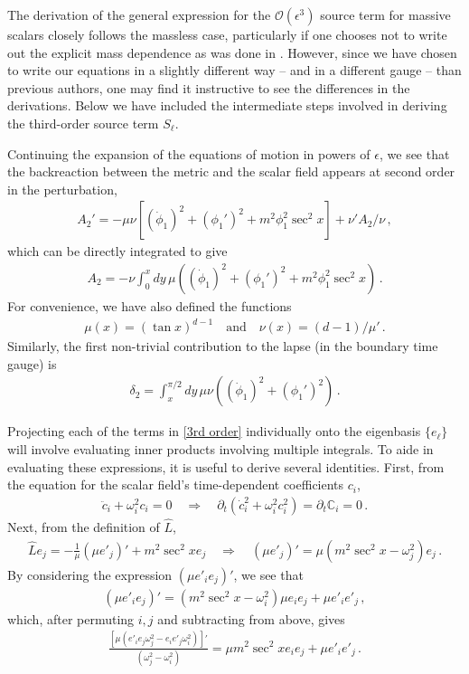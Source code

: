 \documentclass[letterpaper,11pt]{article}
\newcommand{\p}{\partial}
\newcommand{\oi}{\omega_i}
\newcommand{\oj}{\omega_j}
\newcommand{\mc}{\mathcal}
\begin{document}
The derivation of the general expression for the $\mc{O}(\epsilon^3)$ source term for massive scalars closely follows the massless case, particularly if one chooses not to write out the explicit mass dependence as was done in \cite{1810.04753}. However, since we have chosen to write our equations in a slightly different way -- and in a different gauge -- than previous authors, one may find it instructive to see the differences in the derivations. Below we have included the intermediate steps involved in deriving the third-order source term $S_\ell$.

Continuing the expansion of the equations of motion in powers of $\epsilon$, we see that the backreaction between the metric and the scalar field appears at second order in the perturbation,
\begin{align}
A_2' = - \mu \nu \left[ (\dot \phi_1 )^2 + (\phi_1')^2 + m^2 \phi_1^2 \sec^2 x \right] + \nu' A_2 / \nu \, ,
\end{align}
which can be directly integrated to give
\begin{align}
A_2 = -\nu \int^x_0 dy \, \mu \left( (\dot \phi_1 )^2 + (\phi_1')^2 + m^2 \phi_1^2 \sec^2 x \right) \, .
\end{align}
For convenience, we have also defined the functions
\begin{align}
\mu (x) = \left( \tan x \right)^{d-1} \quad \text{and} \quad \nu(x) = (d-1) / \mu ' \, .
\end{align}
Similarly, the first non-trivial contribution to the lapse (in the boundary time gauge) is
\begin{align}
\delta_2 = \int^{\pi/2}_x dy \, \mu \nu \left(  (\dot \phi_1 )^2 + (\phi_1')^2 \right) \, .
\end{align}

Projecting each of the terms in \eqref{3rd order} individually onto the eigenbasis $\{ e_\ell \}$ will involve evaluating inner products involving multiple integrals. To aide in evaluating these expressions, it is useful to derive several identities. First, from the equation for the scalar field's time-dependent coefficients $c_i$,
\begin{align} 
\ddot c_i + \oi^2 c_i = 0 \quad \Rightarrow \quad \p_t \left(\dot c_i^2 + \oi^2 c_i^2 \right) = \p_t \mathbb C_i = 0 \, .
\end{align}
Next, from the definition of $\hat L$,
\begin{align}
\hat L e_j = -\frac{1}{\mu} \left( \mu e'_j \right)' + m^2 \sec^2 x e_j \quad \Rightarrow \quad \left( \mu e'_j \right)' = \mu \left( m^2 \sec^2 x - \omega_j^2 \right) e_j \, .
\end{align}
By considering the expression $\left( \mu e'_i e_j \right)'$, we see that
\begin{align}
\left( \mu e'_i e_j \right) ' = \left(m^2 \sec^2 x - \oi^2 \right) \mu e_i e_j + \mu e'_i e'_j \, ,
\end{align}
which, after permuting $i, j$ and subtracting from above, gives
\begin{align}
\frac{\left[ \mu (e'_i e_j \oj^2 - e_i e'_j \oi^2 ) \right]'}{(\oj^2 - \oi^2)} = \mu m^2 \sec^2 x e_i e_j + \mu e'_i e'_j \, .
\end{align}
\end{document}
